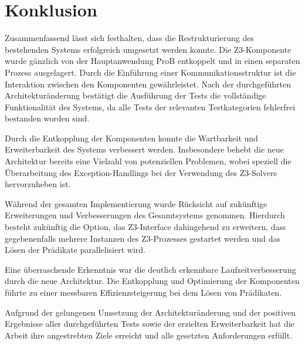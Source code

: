 

\section{Konklusion}

Zusammenfassend lässt sich festhalten, dass die Restrukturierung des bestehenden Systems erfolgreich umgesetzt werden konnte.
Die Z3-Komponente wurde gänzlich von der Hauptanwendung ProB entkoppelt und in einen separaten Prozess ausgelagert.
Durch die Einführung einer Kommunikationsstruktur ist die Interaktion zwischen den Komponenten gewährleistet.
Nach der durchgeführten Architekturänderung bestätigt die Ausführung der Tests die vollständige Funktionalität des Systems,
da alle Tests der relevanten Testkategorien fehlerfrei bestanden worden sind.

Durch die Entkopplung der Komponenten konnte die Wartbarkeit und Erweiterbarkeit des Systems verbessert werden.
Insbesondere behebt die neue Architektur bereits eine Vielzahl von potenziellen Problemen,
wobei speziell die Überarbeitung des Exception-Handlings bei der Verwendung des Z3-Solvers hervorzuheben ist.

Während der gesamten Implementierung wurde Rücksicht auf zukünftige Erweiterungen und Verbesserungen des Gesamtsystems genommen.
Hierdurch besteht zukünftig die Option,
das Z3-Interface dahingehend zu erweitern,
dass gegebenenfalls mehrere Instanzen des Z3-Prozesses gestartet werden und das Lösen der Prädikate parallelisiert wird.

Eine überraschende Erkenntnis war die deutlich erkennbare Laufzeitverbesserung durch die neue Architektur.
Die Entkopplung und Optimierung der Komponenten führte
zu einer messbaren Effizienzsteigerung bei dem Lösen von Prädikaten.

Aufgrund der gelungenen Umsetzung der Architekturänderung und der positiven Ergebnisse aller durchgeführten Tests
sowie der erzielten Erweiterbarkeit hat die Arbeit ihre angestrebten Ziele erreicht und alle gesetzten Anforderungen erfüllt.
